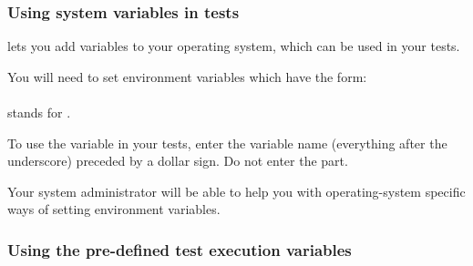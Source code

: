 \subsubsection{Using system variables in tests}
\label{TasksSystemVariables}


\jb{} lets you add variables to your operating system, which can be used in your tests. 

You will need to set environment variables which have the form:\\

\\

 stands for . 

To use the variable in your tests, enter the variable name (everything after the underscore) preceded by a dollar sign. Do not enter the  part.


Your system administrator will be able to help you with operating-system specific ways of setting environment variables. 



\subsubsection{Using the \jb{}pre-defined test execution variables}
\label{TasksPredefinedVariables}

